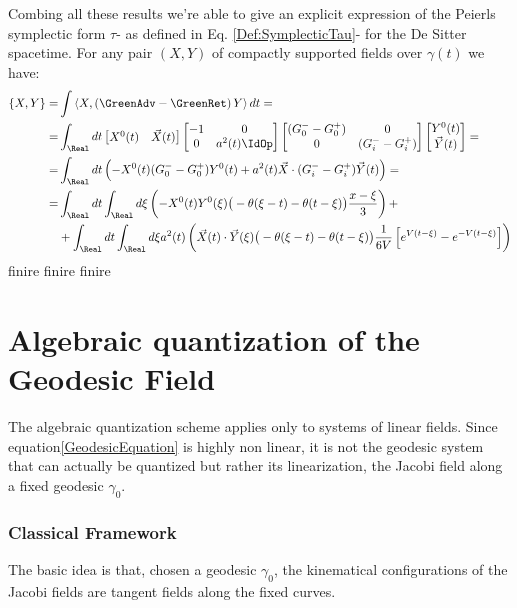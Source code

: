 \documentclass[Main]{subfiles}
\begin{document}
			Combing all these results we're able to give an explicit expression of the Peierls symplectic form $\tau$- as defined in Eq. 	\ref{Def:SymplecticTau}- for the De Sitter spacetime.
			For any pair $(X, Y)$ of compactly supported fields over $\gamma(t)$ we have:
			\begin{align*}
			\{X ,Y \} =&\int \left\langle X, \left(\GreenAdv - \GreenRet \right)Y \right\rangle dt =	\\
			=&
			\int_\Real dt  
				 \begin{bmatrix}  
					 X^0(t) & \vec{X}(t) \\
				 \end{bmatrix}
				 \begin{bmatrix}  
				 	-1 & 0 \\
				 	0 & a^2(t)\IdOp
				 \end{bmatrix}			
				 \begin{bmatrix}  
				 	(G^-_0 - G^+_0) & 0 \\
				 	0 & (G^-_i - G^+_i)
				 \end{bmatrix}	
				 \begin{bmatrix}  
				 	Y^0(t) \\ \vec{Y}(t)
				 \end{bmatrix}	
				 = \\
			=&
				\int_\Real dt  \left(
					-X^0(t) (G^-_0 - G^+_0)Y^0(t)+
					a^2(t)\vec{X} \cdot (G^-_i- G^+_i)\vec{Y}(t)
				\right) = \\
			=&
				\int_\Real dt 				\int_\Real d\xi \left(
					-X^0(t)Y^0(\xi)\big(-\theta(\xi -t)-\theta(t-\xi )\big)\frac{x-\xi}{3} \right) +\\
			&+
					\int_\Real dt 				\int_\Real d\xi a^2(t) \left(
					\vec{X}(t) \cdot \vec{Y}(\xi)
						\big(-\theta(\xi -t)-\theta(t-\xi )\big) \frac{1}{6V}\left[ e^{V(t-\xi)} - e^{-V(t-\xi)}\right]
					\right)
			\end{align*}					
		\danger finire finire finire
		

\section{Algebraic quantization of the Geodesic Field}
	The algebraic quantization scheme applies only to %
	systems of linear fields.
	Since equation\ref{GeodesicEquation} is highly non linear,  it is not the geodesic system that can actually be quantized but rather its linearization, the Jacobi field along a fixed geodesic $\gamma_0$.
	
		\subsubsection{Classical Framework}
			The basic idea is that, chosen a geodesic $\gamma_0$, the kinematical configurations of the Jacobi fields are tangent fields along the fixed curves.
\end{document}
